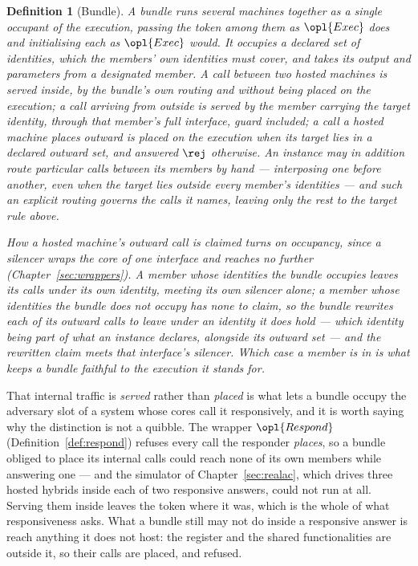 \documentclass[10pt,oneside,openany]{book}
\theoremstyle{accentdef}
\newtheorem{definition}{Definition}[chapter]
\theoremstyle{accentplain}
\begin{document}
\begin{definition}[Bundle]\label{def:bundle}
A \emph{bundle} runs several machines together as a single occupant of the execution, passing the
token among them as $\opl{Exec}$ does and initialising each as $\opl{Exec}$ would. It occupies a
declared set of identities, which the members' own identities must cover, and takes its output and
parameters from a designated member. A call between two hosted machines is served inside, by the
bundle's own routing and \emph{without being placed on the execution}; a call arriving from outside
is served by the member carrying the target identity, through that member's full interface, guard
included; a call a
hosted machine places outward is placed on the execution when its target lies in a declared
\emph{outward set}, and answered $\rej$ otherwise. An instance may in addition route particular
calls between its members by hand --- interposing one before another, even when the target lies
outside every member's identities --- and such an explicit routing governs the calls it names,
leaving only the rest to the target rule above.

How a hosted machine's outward call is claimed turns on occupancy, since a silencer wraps the
core of one interface and reaches no further (Chapter~\ref{sec:wrappers}). A member \emph{whose
identities the bundle occupies} leaves its calls under its own identity, meeting its own silencer
alone; a member \emph{whose identities the bundle does not occupy} has none to claim, so the
bundle rewrites each of its outward calls to leave under an identity it does hold --- which
identity being part of what an instance declares, alongside its outward set --- and the
rewritten claim meets that interface's silencer. Which case a member is in is what keeps a bundle
faithful to the execution it stands for.
\end{definition}

That internal traffic is \emph{served} rather than \emph{placed} is what lets a bundle occupy the
adversary slot of a system whose cores call it responsively, and it is worth saying why the
distinction is not a quibble. The wrapper $\opl{Respond}$ (Definition~\ref{def:respond}) refuses every call the
responder \emph{places}, so a bundle obliged to place its internal calls could reach none of its
own members while answering one --- and the simulator of Chapter~\ref{sec:realac}, which drives
three hosted hybrids inside each of two responsive answers, could not run at all. Serving them
inside leaves the token where it was, which is the whole of what responsiveness asks. What a bundle
still may not do inside a responsive answer is reach anything it does not host: the register and
the shared functionalities are outside it, so their calls are placed, and refused.
\end{document}
